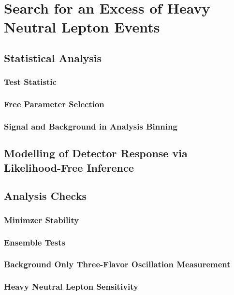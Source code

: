 \setchapterpreamble[u]{\margintoc}

\chapter{Search for an Excess of Heavy Neutral Lepton Events}


\section{Statistical Analysis}

\subsection{Test Statistic}

\subsection{Free Parameter Selection}

\subsection{Signal and Background in Analysis Binning}


\section{Modelling of Detector Response via Likelihood-Free Inference}


\section{Analysis Checks}

\subsection{Minimzer Stability}

\subsection{Ensemble Tests}

\subsection{Background Only Three-Flavor Oscillation Measurement}

\subsection{Heavy Neutral Lepton Sensitivity}



